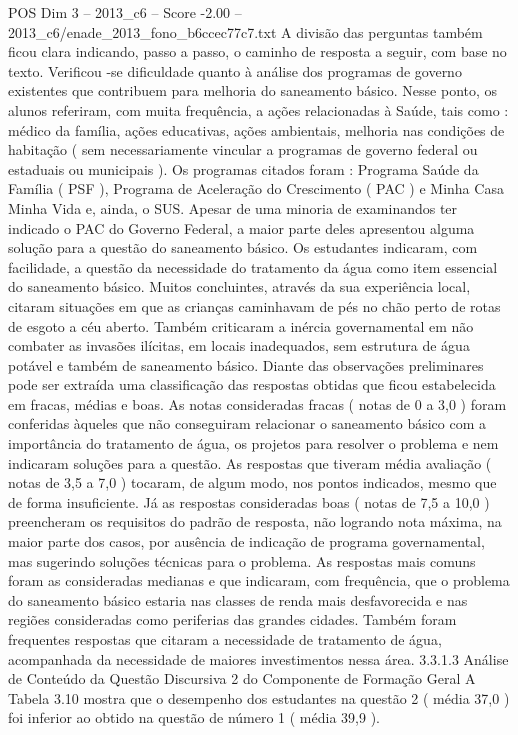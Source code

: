 \begin{textsample}{POS Dim 3 – 2013\_c6 – Score -2.00 – 2013\_c6/enade\_2013\_fono\_b6ccec77c7.txt}
A divisão das perguntas também ficou clara indicando, passo a passo, o caminho de resposta a seguir, com base no texto.
Verificou -se dificuldade quanto à análise dos programas de governo existentes que contribuem para melhoria do saneamento básico.
Nesse ponto, os alunos referiram, com muita frequência, a ações relacionadas à Saúde, tais como : médico da família, ações educativas, ações ambientais, melhoria nas condições de habitação ( sem necessariamente vincular a programas de governo federal ou estaduais ou municipais ).
Os programas citados foram : Programa Saúde da Família ( PSF ), Programa de Aceleração do Crescimento ( PAC ) e Minha Casa Minha Vida e, ainda, o SUS.
Apesar de uma minoria de examinandos ter indicado o PAC do Governo Federal, a maior parte deles apresentou alguma solução para a questão do saneamento básico.
Os estudantes indicaram, com facilidade, a questão da necessidade do tratamento da água como item essencial do saneamento básico.
Muitos concluintes, através da sua experiência local, citaram situações em que as crianças caminhavam de pés no chão perto de rotas de esgoto a céu aberto.
Também criticaram a inércia governamental em não combater as invasões ilícitas, em locais inadequados, sem estrutura de água potável e também de saneamento básico.
Diante das observações preliminares pode ser extraída uma classificação das respostas obtidas que ficou estabelecida em fracas, médias e boas.
As notas consideradas fracas ( notas de 0 a 3,0 ) foram conferidas àqueles que não conseguiram relacionar o saneamento básico com a importância do tratamento de água, os projetos para resolver o problema e nem indicaram soluções para a questão.
As respostas que tiveram média avaliação ( notas de 3,5 a 7,0 ) tocaram, de algum modo, nos pontos indicados, mesmo que de forma insuficiente.
Já as respostas consideradas boas ( notas de 7,5 a 10,0 ) preencheram os requisitos do padrão de resposta, não logrando nota máxima, na maior parte dos casos, por ausência de indicação de programa governamental, mas sugerindo soluções técnicas para o problema.
As respostas mais comuns foram as consideradas medianas e que indicaram, com frequência, que o problema do saneamento básico estaria nas classes de renda mais desfavorecida e nas regiões consideradas como periferias das grandes cidades.
Também foram frequentes respostas que citaram a necessidade de tratamento de água, acompanhada da necessidade de maiores investimentos nessa área. 3.3.1.3 Análise de Conteúdo da Questão Discursiva 2 do Componente de Formação Geral A Tabela 3.10 mostra que o desempenho dos estudantes na questão 2 ( média 37,0 ) foi inferior ao obtido na questão de número 1 ( média 39,9 ).

\end{textsample}
